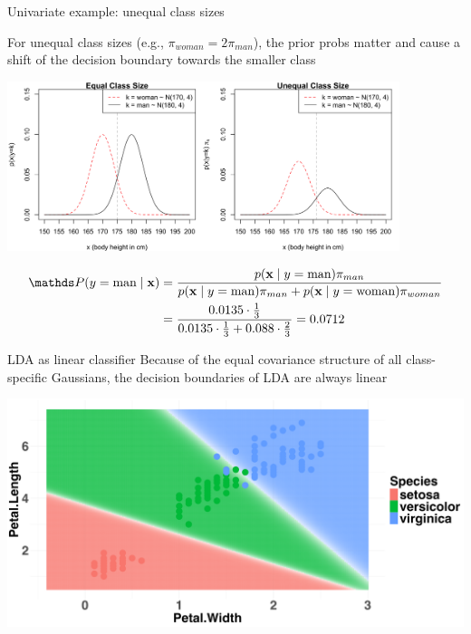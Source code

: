 \documentclass[11pt,compress,t,notes=noshow, xcolor=table]{beamer}
\begin{document}
\begin{vbframe}{Univariate example: unequal class sizes}
\begin{small}
For unequal class sizes (e.g., $\pi_{woman} = 2\pi_{man}$), the prior probs matter and cause a shift of the decision boundary towards the smaller class
\begin{center}
\includegraphics[width=0.86\textwidth, clip=true, trim={0 0 0 0}]{figure/disc_univariate-3.png}
\end{center}
\begin{align*}
\P(y = \text{man} \mid \xv) &= \frac{p(\xv \mid y = \text{man}) \pi_{man}}{p(\xv \mid y = \text{man}) \pi_{man} + p(\xv \mid y = \text{woman}) \pi_{woman}}\\
&=\frac{0.0135 \cdot \tfrac{1}{3}}{0.0135 \cdot \tfrac{1}{3} + 0.088 \cdot \tfrac{2}{3}} = 0.0712
\end{align*}

\end{small}

\end{vbframe}

\begin{vbframe}{LDA as linear classifier}
Because of the equal covariance structure of all class-specific Gaussians, the decision boundaries of LDA are always linear

\begin{center}
\includegraphics[width=\textwidth, clip=true, trim={0 0 0 0}]{figure/disc_db-lda.png}
\end{center}

\end{vbframe}
\end{document}

